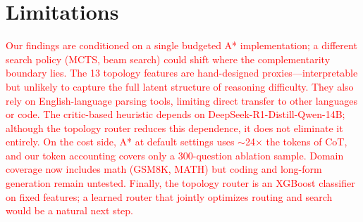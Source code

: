 \documentclass[11pt]{article}
\begin{document}
\section*{Limitations}
\label{sec:limitations}
\textcolor{red}{Our findings are conditioned on a single budgeted A* implementation; a different search policy (MCTS, beam search) could shift where the complementarity boundary lies. The 13 topology features are hand-designed proxies---interpretable but unlikely to capture the full latent structure of reasoning difficulty. They also rely on English-language parsing tools, limiting direct transfer to other languages or code. The critic-based heuristic depends on DeepSeek-R1-Distill-Qwen-14B; although the topology router reduces this dependence, it does not eliminate it entirely. On the cost side, A* at default settings uses $\sim$24$\times$ the tokens of CoT, and our token accounting covers only a 300-question ablation sample. Domain coverage now includes math (GSM8K, MATH) but coding and long-form generation remain untested. Finally, the topology router is an XGBoost classifier on fixed features; a learned router that jointly optimizes routing and search would be a natural next step.}








\end{document}
